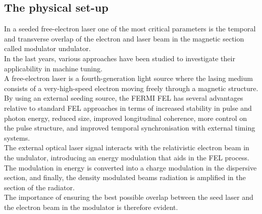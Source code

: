 \documentclass[
reprint,
amsmath,amssymb,amsfonts,clevref,
aps,
prstab,
]{revtex4-2}
\begin{document}
	\subsection{The physical set-up}
	In a seeded free-electron laser one of the most critical parameters is the temporal and transverse overlap of the electron and laser beam in the magnetic section called modulator undulator.\\
	In the last years, various approaches have been studied to investigate their applicability in machine tuning. \\
	A free-electron laser is a fourth-generation light source where the lasing medium consists of a very-high-speed electron moving freely through a magnetic structure. By using an external seeding source, the FERMI FEL has several advantages relative to standard FEL approaches in terms of increased stability in pulse and photon energy, reduced size, improved longitudinal coherence, more control on the pulse structure, and improved temporal synchronisation with external timing systems.\\
	The external optical laser signal interacts with the relativistic electron beam in the undulator, introducing an energy modulation that aids in the FEL process. The modulation in energy is converted into a charge modulation in the dispersive section, and finally, the density modulated beams radiation is amplified in the section of the radiator.\\
	The importance of ensuring the best possible overlap between the seed laser and the electron beam in the modulator is therefore evident.\\
\end{document}
